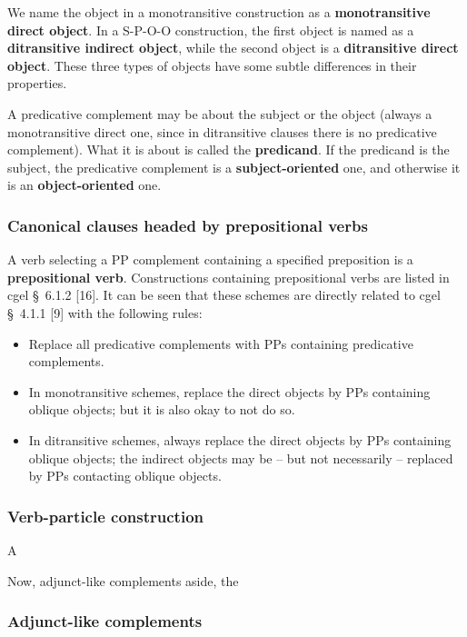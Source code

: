 \documentclass{article}
\newcommand*{\citesec}[1]{\S~{#1}}
\newcommand*{\concept}[1]{\textbf{#1}}
\begin{document}
We name the object in a monotransitive construction as a \concept{monotransitive direct object}.
In a S-P-O-O construction, 
the first object is named as a \concept{ditransitive indirect object},
while the second object is a \concept{ditransitive direct object}.
These three types of objects have some subtle differences in their properties. %

A predicative complement may be about the subject or the object 
(always a monotransitive direct one, since in ditransitive clauses there is no predicative complement).
What it is about is called the \concept{predicand}.
If the predicand is the subject, the predicative complement is a \concept{subject-oriented} one,
and otherwise it is an \concept{object-oriented} one.

\subsubsection{Canonical clauses headed by prepositional verbs}

A verb selecting a PP complement containing a specified preposition is a \concept{prepositional verb}.
Constructions containing prepositional verbs are listed in \ac{cgel} \citesec{6.1.2} [16].
It can be seen that these schemes are directly related to \ac{cgel} \citesec{4.1.1} [9]
with the following rules:
\begin{itemize}
    \item Replace all predicative complements with PPs containing predicative complements.
    \item In monotransitive schemes, replace the direct objects by PPs containing oblique objects; 
    but it is also okay to not do so.
    \item In ditransitive schemes, always replace the direct objects by PPs containing oblique objects;
    the indirect objects may be -- but not necessarily -- replaced by PPs contacting oblique objects.
\end{itemize}

\subsubsection{Verb-particle construction}

A 

Now, adjunct-like complements aside, 
the 

\subsubsection{Adjunct-like complements}
\end{document}
